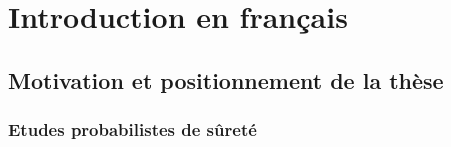 \chapter{Introduction en français}\label{chap:intro-french}

\renewcommand{\chaptertitlenamelng}{Chapitre}
\renewcommand{\partname}{Partie}


\begin{abstract}[Résumé]
    Ce chapitre ne diffère du \hyperref[chap:intro-english]{chapitre 1} que par sa rédaction en langue française.
    En premier lieu, nous introduisons et motivons les travaux de recherche qui ont été menés au cours de cette thèse. Ils s’inscrivent dans une problématique qui vise à améliorer les méthodes d’études sismiques probabilistes du fait du manque de réponse qu’apporte l’état de l’art à la question du choix du prior en inférence bayésienne. En second lieu, nous présentons l’organisation du manuscrit qui s’appuie sur une reformulation de la problématique sous la forme de six principales questions.
\end{abstract}

\minitoc

\section{Motivation et positionnement de la thèse}

\subsection{Etudes probabilistes de sûreté}
%

